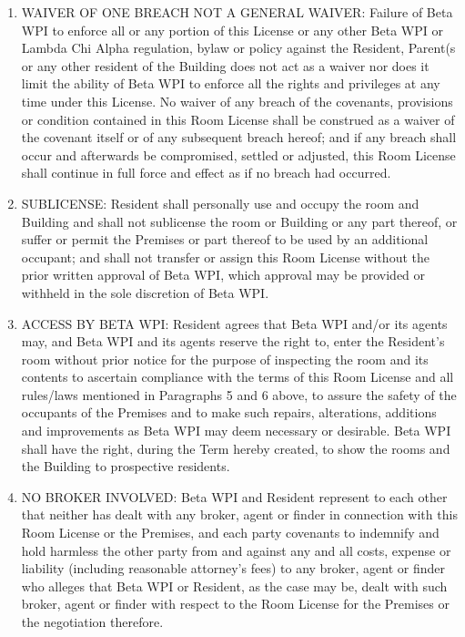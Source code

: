 \documentclass[legalpaper, 12pt]{article}
\begin{document}
\begin{enumerate}
        \item WAIVER OF ONE BREACH NOT A GENERAL WAIVER\@: Failure of Beta WPI to
                enforce all or any portion of this License or any other Beta WPI
                or Lambda Chi Alpha regulation, bylaw or policy against the
                Resident, Parent(s or any other resident of the Building does
                not act as a waiver nor does it limit the ability of Beta WPI to
                enforce all the rights and privileges at any time under this
                License.  No waiver of any breach of the covenants, provisions
                or condition contained in this Room License shall be construed
                as a waiver of the covenant itself or of any subsequent breach
                hereof; and if any breach shall occur and afterwards be
                compromised, settled or adjusted, this Room License shall
                continue in full force and effect as if no breach had occurred.

        \item SUBLICENSE\@: Resident shall personally use and occupy the room and
                Building and shall not sublicense the room or Building or any
                part thereof, or suffer or permit the Premises or part thereof
                to be used by an additional occupant; and shall not transfer or
                assign this Room License without the prior written approval of
                Beta WPI, which approval may be provided or withheld in the sole
                discretion of Beta WPI\@.

        \item ACCESS BY BETA WPI\@: Resident agrees that Beta WPI and/or its
                agents may, and Beta WPI and its agents reserve the right to,
                enter the Resident’s room without prior notice for the purpose
                of inspecting the room and its contents to ascertain compliance
                with the terms of this Room License and all rules/laws mentioned
                in Paragraphs 5 and 6 above, to assure the safety of the
                occupants of the Premises and to make such repairs, alterations,
                additions and improvements as Beta WPI may deem necessary or
                desirable.  Beta WPI shall have the right, during the Term
                hereby created, to show the rooms and the Building to
                prospective residents.

        \item NO BROKER INVOLVED\@: Beta WPI and Resident represent to each other
                that neither has dealt with any broker, agent or finder in
                connection with this Room License or the Premises, and each
                party covenants to indemnify and hold harmless the other party
                from and against any and all costs, expense or liability
                (including reasonable attorney’s fees) to any broker, agent or
                finder who alleges that Beta WPI or Resident, as the case may
                be, dealt with such broker, agent or finder with respect to the
                Room License for the Premises or the negotiation therefore.
        

\end{enumerate}
\end{document}
